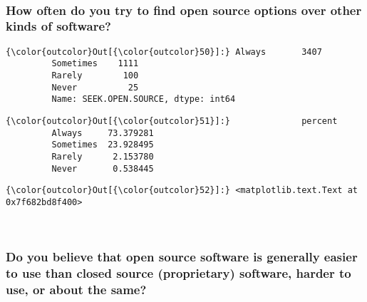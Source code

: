 \documentclass[11pt]{article}
\begin{document}
    \begin{center}
    \end{center}
    { \hspace*{\fill} \\}
    
    \subsubsection{How often do you try to find open source options over
other kinds of
software?}\label{how-often-do-you-try-to-find-open-source-options-over-other-kinds-of-software}


            \begin{Verbatim}[commandchars=\\\{\}]
{\color{outcolor}Out[{\color{outcolor}50}]:} Always       3407
         Sometimes    1111
         Rarely        100
         Never          25
         Name: SEEK.OPEN.SOURCE, dtype: int64
\end{Verbatim}
        

            \begin{Verbatim}[commandchars=\\\{\}]
{\color{outcolor}Out[{\color{outcolor}51}]:}              percent
         Always     73.379281
         Sometimes  23.928495
         Rarely      2.153780
         Never       0.538445
\end{Verbatim}
        

            \begin{Verbatim}[commandchars=\\\{\}]
{\color{outcolor}Out[{\color{outcolor}52}]:} <matplotlib.text.Text at 0x7f682bd8f400>
\end{Verbatim}
        
    \begin{center}
    \end{center}
    { \hspace*{\fill} \\}
    
    \subsubsection{Do you believe that open source software is generally
easier to use than closed source (proprietary) software, harder to use,
or about the
same?}\label{do-you-believe-that-open-source-software-is-generally-easier-to-use-than-closed-source-proprietary-software-harder-to-use-or-about-the-same}
\end{document}
